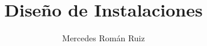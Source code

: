 \documentclass[10pt, a4paper, twoside, twocolumn]{book}
\title{Diseño de Instalaciones}
\author{Mercedes Román Ruiz}
\date{}
\begin{document}
\sloppy 
\setlength{\parindent}{15pt} %
\setlength{\parskip}{5pt} %
\renewcommand\thesection{\arabic{section}}
\renewcommand{\baselinestretch}{1.5}
\renewcommand{\listtablename}{Índice de tablas} %
\renewcommand{\tablename}{Tabla} %
\renewcommand{\baselinestretch}{1.5}

\fancyhead{}
\fancyfoot{}
\pagestyle{fancy}
\chead[\rightmark]{\leftmark}

\fancyfoot[LE,RO]{\thepage}



%

%



\end{document}
